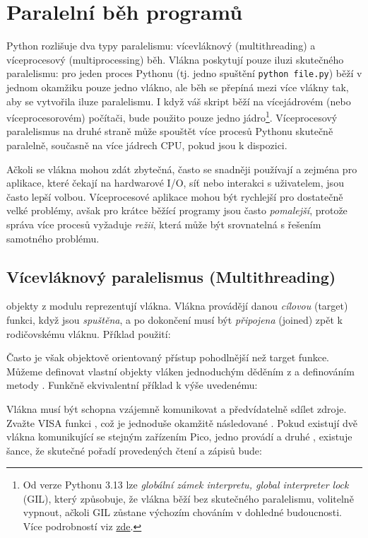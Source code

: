 \newpage
\section{Paralelní běh programů}
Python rozlišuje dva typy paralelismu: vícevláknový (multithreading) a víceprocesový (multiprocessing) běh. Vlákna poskytují pouze iluzi skutečného paralelismu: pro jeden proces Pythonu (tj. jedno spuštění \verb|python file.py|) běží v jednom okamžiku pouze jedno vlákno, ale běh se přepíná mezi více vlákny tak, aby se vytvořila iluze paralelismu. I když váš skript běží na vícejádrovém (nebo víceprocesorovém) počítači, bude použito pouze jedno jádro\footnote{Od verze Pythonu 3.13 lze \emph{globální zámek interpretu, global interpreter lock} (GIL), který způsobuje, že vlákna běží bez skutečného paralelismu, volitelně vypnout, ačkoli GIL zůstane výchozím chováním v dohledné budoucnosti. Více podrobností viz \href{https://docs.python.org/3.13/whatsnew/3.13.html\#whatsnew313-free-threaded-cpython}{zde}.}. Víceprocesový paralelismus na druhé straně může spouštět více procesů Pythonu skutečně paralelně, současně na více jádrech CPU, pokud jsou k dispozici.

Ačkoli se vlákna mohou zdát zbytečná, často se snadněji používají a zejména pro aplikace, které čekají na hardwarové I/O, síť nebo interakci s uživatelem, jsou často lepší volbou. Víceprocesové aplikace mohou být rychlejší pro dostatečně velké problémy, avšak pro krátce běžící programy jsou často \emph{pomalejší}, protože správa více procesů vyžaduje \emph{režii}, která může být srovnatelná s řešením samotného problému.

\subsection{Vícevláknový paralelismus (Multithreading)}

 objekty z modulu  reprezentují vlákna. Vlákna provádějí danou \emph{cílovou} (target) funkci, když jsou \emph{spuštěna}, a po dokončení musí být \emph{připojena} (joined) zpět k rodičovskému vláknu. Příklad použití:


Často je však objektově orientovaný přístup pohodlnější než target funkce. Můžeme definovat vlastní objekty vláken jednoduchým děděním z  a definováním metody . Funkčně ekvivalentní příklad k výše uvedenému:


Vlákna musí být schopna vzájemně komunikovat a předvídatelně sdílet zdroje. Zvažte VISA funkci , což je jednoduše  okamžitě následované . Pokud existují dvě vlákna komunikující se stejným zařízením Pico, jedno provádí  a druhé , existuje šance, že skutečné pořadí provedených čtení a zápisů bude:

